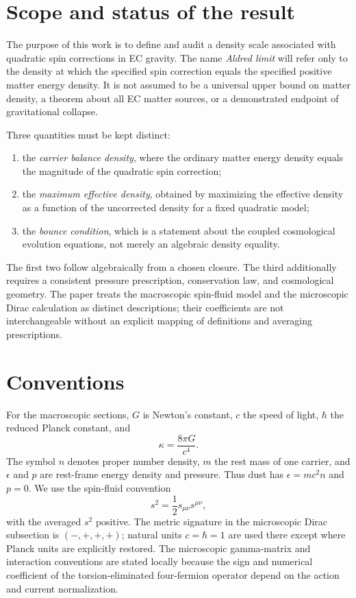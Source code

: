 \documentclass[11pt]{article}
\begin{document}
\section{Scope and status of the result}
The purpose of this work is to define and audit a density scale associated with quadratic spin corrections in EC gravity. The name \emph{Aldred limit} will refer only to the density at which the specified spin correction equals the specified positive matter energy density. It is not assumed to be a universal upper bound on matter density, a theorem about all EC matter sources, or a demonstrated endpoint of gravitational collapse.

Three quantities must be kept distinct:
\begin{enumerate}
\item the \emph{carrier balance density}, where the ordinary matter energy density equals the magnitude of the quadratic spin correction;
\item the \emph{maximum effective density}, obtained by maximizing the effective density as a function of the uncorrected density for a fixed quadratic model;
\item the \emph{bounce condition}, which is a statement about the coupled cosmological evolution equations, not merely an algebraic density equality.
\end{enumerate}
The first two follow algebraically from a chosen closure. The third additionally requires a consistent pressure prescription, conservation law, and cosmological geometry. The paper treats the macroscopic spin-fluid model and the microscopic Dirac calculation as distinct descriptions; their coefficients are not interchangeable without an explicit mapping of definitions and averaging prescriptions.

\section{Conventions}
For the macroscopic sections, $G$ is Newton's constant, $c$ the speed of light, $\hbar$ the reduced Planck constant, and
\begin{equation}
\kappa=\frac{8\pi G}{c^4}.
\label{eq:kappa}
\end{equation}
The symbol $n$ denotes proper number density, $m$ the rest mass of one carrier, and $\epsilon$ and $p$ are rest-frame energy density and pressure. Thus dust has $\epsilon=mc^2n$ and $p=0$. We use the spin-fluid convention
\begin{equation}
s^2=\frac12 s_{\mu\nu}s^{\mu\nu},
\label{eq:sdef}
\end{equation}
with the averaged $s^2$ positive. The metric signature in the microscopic Dirac subsection is $(-,+,+,+)$; natural units $c=\hbar=1$ are used there except where Planck units are explicitly restored. The microscopic gamma-matrix and interaction conventions are stated locally because the sign and numerical coefficient of the torsion-eliminated four-fermion operator depend on the action and current normalization.
\end{document}
